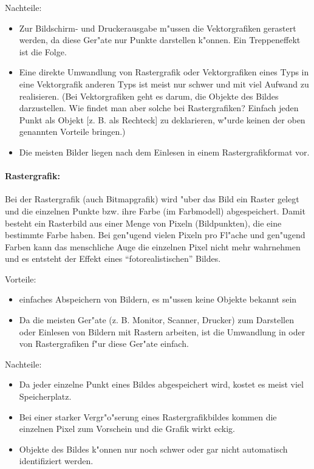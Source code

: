 \bigskip\noindent
Nachteile:
\begin{itemize}
  \item	Zur Bildschirm- und Druckerausgabe m"ussen die Vektorgrafiken gerastert werden, da diese Ger"ate nur Punkte darstellen k"onnen. Ein Treppeneffekt ist die Folge.
  \item	Eine direkte Umwandlung von Rastergrafik oder Vektorgrafiken eines Typs in eine Vektorgrafik anderen Typs ist meist nur schwer und mit viel Aufwand zu realisieren. (Bei Vektorgrafiken geht es darum, die Objekte des Bildes darzustellen. Wie findet man aber solche bei Rastergrafiken? Einfach jeden Punkt als Objekt [z. B. als Rechteck] zu deklarieren, w"urde keinen der oben genannten Vorteile bringen.)
  \item	Die meisten Bilder liegen nach dem Einlesen in einem Rastergrafikformat vor.
\end{itemize}


\paragraph{Rastergrafik:}

Bei der Rastergrafik (auch Bitmapgrafik) wird "uber das Bild ein Raster gelegt und die einzelnen Punkte bzw. ihre Farbe (im Farbmodell) abgespeichert. Damit besteht ein Rasterbild aus einer Menge von Pixeln (Bildpunkten), die eine bestimmte Farbe haben. Bei gen"ugend vielen Pixeln pro Fl"ache und gen"ugend Farben kann das menschliche Auge die einzelnen Pixel nicht mehr wahrnehmen und es entsteht der Effekt eines ``fotorealistischen'' Bildes.

\bigskip\noindent
Vorteile:
\begin{itemize}
  \item	einfaches Abspeichern von Bildern, es m"ussen keine Objekte bekannt sein
  \item	Da die meisten Ger"ate (z. B. Monitor, Scanner, Drucker) zum Darstellen oder Einlesen von Bildern mit Rastern arbeiten, ist die Umwandlung in oder von Rastergrafiken f"ur diese Ger"ate einfach.
\end{itemize}

\bigskip\noindent
Nachteile:
\begin{itemize}
  \item	Da jeder einzelne Punkt eines Bildes abgespeichert wird, kostet es meist viel Speicherplatz.
  \item	Bei einer starker Vergr"o"serung eines Rastergrafikbildes kommen die einzelnen Pixel zum Vorschein und die Grafik wirkt eckig.
  \item	Objekte des Bildes k"onnen nur noch schwer oder gar nicht automatisch identifiziert werden.
\end{itemize}

